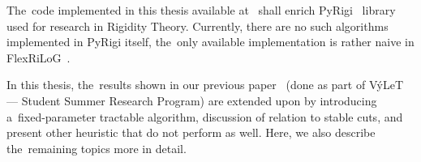 The~code implemented in this thesis available at~\cite{my_code}
shall enrich PyRigi~\cite{pyrigi}
library used for research in Rigidity Theory.
Currently, there are no such algorithms implemented in PyRigi itself,
the~only available implementation is rather naive in FlexRiLoG~\cite{flexrilog}.

In this thesis, the~results shown in our previous paper~\cite{my_paper}
(done as part of VýLeT --- Student Summer Research Program)
are extended upon by introducing a~fixed-parameter tractable algorithm,
discussion of relation to stable cuts,
and present other heuristic that do not perform as well.
Here, we also describe the~remaining topics more in detail.

